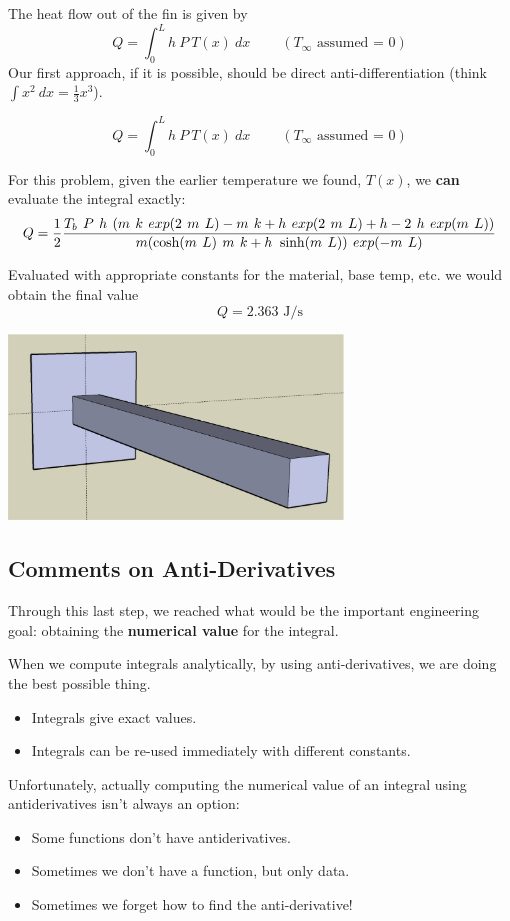 The heat flow out of the fin is given by
$$
Q = \int_0^{L} h ~P ~T(x) ~dx   ~~~~~~~~~~ (T_\infty \mbox{ assumed = 0})
$$
Our first approach, if it is possible, should be direct
anti-differentiation (think $\int x^2 ~dx = \frac{1}{3}x^3$).

\newpage
$$
Q = \int_0^{L} h ~P ~T(x) ~dx   ~~~~~~~~~~ (T_\infty \mbox{ assumed = 0})
$$

For this problem, given the earlier temperature we found, $T(x)$, we
{\bf can} evaluate the integral exactly: \\[1ex]
$$ \large
Q =
\frac{1}{2}\frac{T_b~P~h~(m~k~exp(2~m~L)-m~k+h~exp(2~m~L)+h-2~h~exp(m~L))}{m(\cosh(m~L)~m~k+h~\sinh(m~L))~exp(-m~L)}
$$ 

Evaluated with appropriate constants for the material, base temp,
etc. we would obtain the final value $$Q = 2.363 \mbox{ J/s}$$

\begin{center}
\includegraphics[width=3.5in]{graphics/notes_06_LongPin3D}
\end{center}
\newpage

\subsection*{Comments on Anti-Derivatives}

Through this last step, we reached what would be the important
engineering goal: obtaining the {\bf numerical value} for the
integral.

When we compute integrals analytically, by using anti-derivatives, we
are doing the best possible thing. 
\begin{itemize}
\item Integrals give exact values.
\item Integrals can be re-used immediately with different constants.
\end{itemize}
Unfortunately, actually computing the numerical value of an integral
using antiderivatives isn't always an option:
\begin{itemize}
\item Some functions don't have antiderivatives.  
\vspace{1cm}
\item Sometimes we don't have a function, but only data.
\vspace{1cm}
\item Sometimes we forget how to find the anti-derivative!
\vspace{1cm}
\end{itemize}

